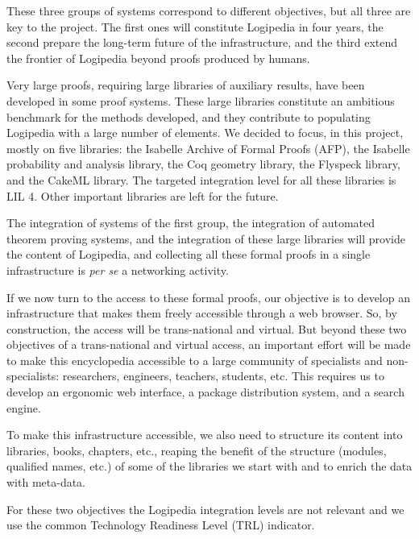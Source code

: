 These three groups of systems correspond to different
objectives, but all three are key to the project. The first ones will
constitute Logipedia in four years, the second prepare the
long-term future of the infrastructure, and the third extend the
frontier of Logipedia beyond proofs produced by humans.

Very large proofs, requiring large libraries of auxiliary results,
have been developed in some proof systems. These large libraries
constitute an ambitious benchmark for the methods developed, and they
contribute to populating Logipedia with a large number of elements.
We decided to focus, in this project, mostly on five libraries: the
Isabelle Archive of Formal Proofs (AFP), the Isabelle probability and
analysis library, the Coq geometry library, the Flyspeck library, and
the CakeML library. The targeted integration level for all these
libraries is LIL 4. Other important libraries are left for the future.

The integration of systems of the first group, the integration of
automated theorem proving systems, and the integration of these large
libraries will provide the content of Logipedia, and collecting all
these formal proofs in a single infrastructure is {\em per se} a
networking activity.

If we now turn to the access to these formal proofs, our objective is
to develop an infrastructure that makes them freely accessible through
a web browser. So, by construction, the access will be trans-national
and virtual. But beyond these two objectives of a trans-national and
virtual access, an important effort will be made to make this
encyclopedia accessible to a large community of specialists and
non-specialists: researchers, engineers, teachers, students, etc.
This requires us to develop an ergonomic web interface,
a package distribution system, and a search engine.

To make this infrastructure accessible, we also need to structure its
content into libraries, books, chapters, etc., reaping the benefit of
the structure (modules, qualified names, etc.) of some of the
libraries we start with and to enrich the data with meta-data.

For these two objectives the Logipedia integration levels are not
relevant and we use the common Technology Readiness Level (TRL) indicator.

